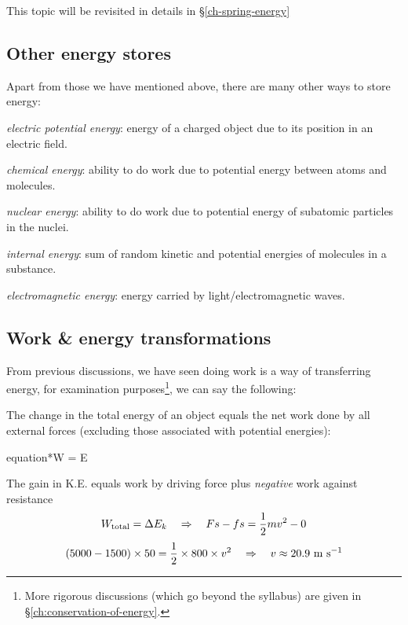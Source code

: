 This topic will be revisited in details in \S\ref{ch-spring-energy}

\subsection{Other energy stores}

Apart from those we have mentioned above, there are many other ways to store energy:

\titem \emph{electric potential energy}: energy of a charged object due to its position in an electric field.

\titem \emph{chemical energy}: ability to do work due to potential energy between atoms and molecules.

\titem \emph{nuclear energy}: ability to do work due to potential energy of subatomic particles in the nuclei.

\titem \emph{internal energy}: sum of random kinetic and potential energies of molecules in a substance.

\titem \emph{electromagnetic energy}: energy carried by light/electromagnetic waves.


\subsection{Work \& energy transformations}

From previous discussions, we have seen doing work is a way of transferring energy,  for examination purposes\footnote{More rigorous discussions (which go beyond the syllabus) are given in \S\ref{ch:conservation-of-energy}.}, we can say the following:

\begin{ilight}
	The change in the total energy of an object equals the net work done by all external forces (excluding those associated with potential energies): \begin{empheq}[box=\tcbhighmath]{equation*}{W  = \Delta E} \end{empheq}
\end{ilight}


\begin{soln} The gain in K.E. equals work by driving force plus \emph{negative} work against resistance
\begin{equation*}
W_\text{total} = \Delta E_k \quad \Rightarrow \quad Fs - fs = \frac{1}{2}mv^2 - 0
\end{equation*}
\begin{equation*}
(5000 - 1500)\times50 = \frac{1}{2}\times800\times v^2 \quad \Rightarrow \quad v\approx20.9\text{ m s$^{-1}$} 
\end{equation*}
\end{soln}

